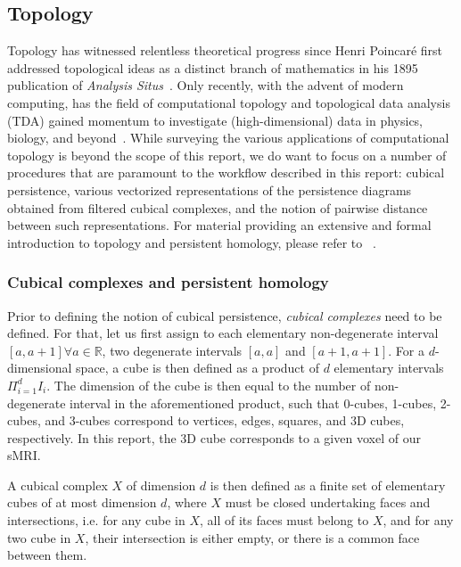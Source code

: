 \documentclass{article}
\begin{document}
\subsection{Topology}

Topology has witnessed relentless theoretical progress since Henri Poincaré first addressed
topological ideas as a distinct branch of mathematics in his 1895 publication of \textit{Analysis
  Situs}~\citep{poincare1895analysis, james1999history}. Only recently, with the advent of
modern computing, has the field of computational topology and topological data analysis (TDA) gained
momentum to investigate (high-dimensional) data in physics, biology, and
beyond~\citep{ghrist2008barcodes, dey1999computational, amezquita2020shape}. While surveying the
various applications of computational topology is beyond the scope of this report, we do want to
focus on a number of procedures that are paramount to the workflow described in this report: cubical
persistence, various vectorized representations of the persistence diagrams obtained from filtered
cubical complexes, and the notion of pairwise distance between such representations. For material
providing an extensive and formal introduction to topology and persistent homology, please refer to
~\citep{freedman2009algebraic, edelsbrunner2010computational, ghrist2008barcodes}.


\subsubsection{Cubical complexes and persistent homology}

Prior to defining the notion of cubical persistence, \emph{cubical complexes} need to be defined.
For that, let us first assign to each elementary non-degenerate interval $[a,a+1]\forall
a\in\mathbb{R}$, two degenerate intervals $[a,a]$ and $[a+1,a+1]$. For a $d$-dimensional space, a
cube is then defined as a product of $d$ elementary intervals $\Pi_{i=1}^{d}I_i$. The dimension of
the cube is then equal to the number of non-degenerate interval in the aforementioned product, such
that 0-cubes, 1-cubes, 2-cubes, and 3-cubes correspond to vertices, edges, squares, and 3D cubes,
respectively. In this report, the 3D cube corresponds to a given voxel of our sMRI.

A cubical complex $X$ of dimension $d$ is then defined as a finite set of elementary cubes of at
most dimension $d$, where $X$ must be closed undertaking faces and intersections, i.e. for any cube
in $X$, all of its faces must belong to $X$, and for any two cube in $X$, their intersection is
either empty, or there is a common face between them.
\end{document}
